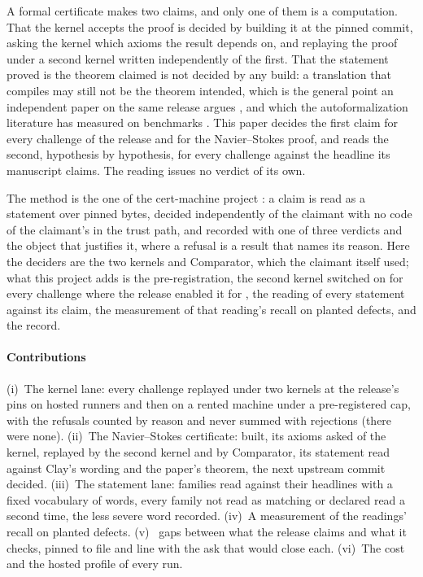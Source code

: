 \documentclass[preprint,11pt,authoryear,a4paper]{elsarticle}
\begin{document}
A formal certificate makes two claims, and only one of them is a computation. That the kernel accepts the proof is decided by building it at the pinned commit, asking the kernel which axioms the result depends on, and replaying the proof under a second kernel written independently of the first. That the statement proved is the theorem claimed is not decided by any build: a translation that compiles may still not be the theorem intended, which is the general point an independent paper on the same release argues \citep{Bastounis26}, and which the autoformalization literature has measured on benchmarks \citep{Wu22Autoformal,Lu24FormalAlign,Liu25BEq,Poiroux25BEq}. This paper decides the first claim for every challenge of the release and for the Navier--Stokes proof, and reads the second, hypothesis by hypothesis, for every challenge against the headline its manuscript claims. The reading issues no verdict of its own.

The method is the one of the cert-machine project \citep[the method paper]{CMArchive}: a claim is read as a statement over pinned bytes, decided independently of the claimant with no code of the claimant's in the trust path, and recorded with one of three verdicts and the object that justifies it, where a refusal is a result that names its reason. Here the deciders are the two kernels and Comparator, which the claimant itself used; what this project adds is the pre-registration, the second kernel switched on for every challenge where the release enabled it for \MtOaNanodaOn, the reading of every statement against its claim, the measurement of that reading's recall on planted defects, and the record.

\paragraph{Contributions} (i)~The kernel lane: every challenge replayed under two kernels at the release's pins on hosted runners and then on a rented machine under a pre-registered cap, with the refusals counted by reason and never summed with rejections (there were none). (ii)~The Navier--Stokes certificate: built, its axioms asked of the kernel, replayed by the second kernel and by Comparator, its statement read against Clay's wording and the paper's theorem, the next upstream commit decided. (iii)~The statement lane: \MtOaStatements{} families read against their headlines with a fixed vocabulary of \OmLaneSWords{} words, every family not read as matching or declared read a second time, the less severe word recorded. (iv)~A measurement of the readings' recall on \MtRrPlants{} planted defects. (v)~\MtOaGaps{} gaps between what the release claims and what it checks, pinned to file and line with the ask that would close each. (vi)~The cost and the hosted profile of every run.
\end{document}
